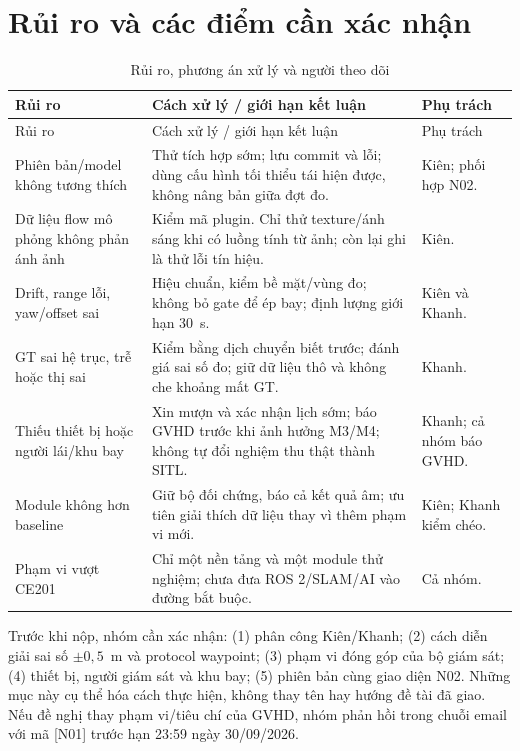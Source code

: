\documentclass[a4paper,12pt]{article}
\newcommand{\tblfont}{\setstretch{1.08}\fontsize{13}{16}\selectfont}
\begin{document}
\section{Rủi ro và các điểm cần xác nhận}
\begingroup\tblfont
\begin{longtable}{L{3.3cm}L{6.3cm}L{4.1cm}}
\caption{Rủi ro, phương án xử lý và người theo dõi}\\
\toprule Rủi ro & Cách xử lý / giới hạn kết luận & Phụ trách\\\midrule\endfirsthead
\toprule Rủi ro & Cách xử lý / giới hạn kết luận & Phụ trách\\\midrule\endhead
Phiên bản/model không tương thích & Thử tích hợp sớm; lưu commit và lỗi; dùng cấu hình tối thiểu tái hiện được, không nâng bản giữa đợt đo. & Kiên; phối hợp N02.\\
Dữ liệu flow mô phỏng không phản ánh ảnh & Kiểm mã plugin. Chỉ thử texture/ánh sáng khi có luồng tính từ ảnh; còn lại ghi là thử lỗi tín hiệu. & Kiên.\\
Drift, range lỗi, yaw/offset sai & Hiệu chuẩn, kiểm bề mặt/vùng đo; không bỏ gate để ép bay; định lượng giới hạn 30~s. & Kiên và Khanh.\\
GT sai hệ trục, trễ hoặc thị sai & Kiểm bằng dịch chuyển biết trước; đánh giá sai số đo; giữ dữ liệu thô và không che khoảng mất GT. & Khanh.\\
Thiếu thiết bị hoặc người lái/khu bay & Xin mượn và xác nhận lịch sớm; báo GVHD trước khi ảnh hưởng M3/M4; không tự đổi nghiệm thu thật thành SITL. & Khanh; cả nhóm báo GVHD.\\
Module không hơn baseline & Giữ bộ đối chứng, báo cả kết quả âm; ưu tiên giải thích dữ liệu thay vì thêm phạm vi mới. & Kiên; Khanh kiểm chéo.\\
Phạm vi vượt CE201 & Chỉ một nền tảng và một module thử nghiệm; chưa đưa ROS 2/SLAM/AI vào đường bắt buộc. & Cả nhóm.\\
\bottomrule
\end{longtable}\endgroup

Trước khi nộp, nhóm cần xác nhận: (1) phân công Kiên/Khanh; (2) cách diễn giải sai số $\pm0{,}5$~m và protocol waypoint; (3) phạm vi đóng góp của bộ giám sát; (4) thiết bị, người giám sát và khu bay; (5) phiên bản cùng giao diện N02. Những mục này cụ thể hóa cách thực hiện, không thay tên hay hướng đề tài đã giao. Nếu đề nghị thay phạm vi/tiêu chí của GVHD, nhóm phản hồi trong chuỗi email với mã [N01] trước hạn 23:59 ngày 30/09/2026\cite{assignment}.
\end{document}

